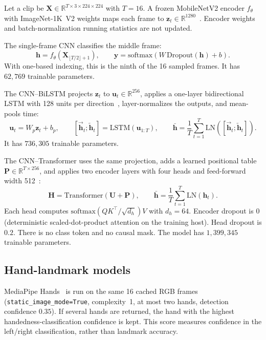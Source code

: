 \documentclass[11pt,a4paper]{article}
\begin{document}
Let a clip be $\mathbf{X} \in \mathbb{R}^{T \times 3 \times 224 \times 224}$ with $T=16$. A frozen MobileNetV2 encoder $f_{\theta}$ with ImageNet-1K~V2 weights maps each frame to $\mathbf{z}_t \in \mathbb{R}^{1280}$~\cite{sandler2018mobilenetv2}. Encoder weights and batch-normalization running statistics are not updated.

The single-frame CNN classifies the middle frame:
\begin{equation}
\mathbf{h} = f_{\theta}(\mathbf{X}_{\lfloor T/2 \rfloor+1}), \qquad
\hat{\mathbf{y}} = \mathrm{softmax}(W \,\mathrm{Dropout}(\mathbf{h}) + b).
\end{equation}
With one-based indexing, this is the ninth of the 16 sampled frames. It has $62{,}769$ trainable parameters.

The CNN--BiLSTM projects $\mathbf{z}_t$ to $\mathbf{u}_t \in \mathbb{R}^{256}$, applies a one-layer bidirectional LSTM with 128 units per direction~\cite{hochreiter1997lstm}, layer-normalizes the outputs, and mean-pools time:
\begin{equation}
\mathbf{u}_t = W_p \mathbf{z}_t + b_p, \qquad
[\overrightarrow{\mathbf{h}}_t; \overleftarrow{\mathbf{h}}_t] = \mathrm{LSTM}(\mathbf{u}_{1:T}), \qquad
\bar{\mathbf{h}} = \frac{1}{T}\sum_{t=1}^{T} \mathrm{LN}([\overrightarrow{\mathbf{h}}_t; \overleftarrow{\mathbf{h}}_t]).
\end{equation}
It has $736{,}305$ trainable parameters.

The CNN--Transformer uses the same projection, adds a learned positional table $\mathbf{P} \in \mathbb{R}^{T \times 256}$, and applies two encoder layers with four heads and feed-forward width 512~\cite{vaswani2017attention}:
\begin{equation}
\mathbf{H} = \mathrm{Transformer}(\mathbf{U} + \mathbf{P}), \qquad
\bar{\mathbf{h}} = \frac{1}{T}\sum_{t=1}^{T} \mathrm{LN}(\mathbf{h}_t).
\end{equation}
Each head computes $\mathrm{softmax}(QK^{\top}/\sqrt{d_h})V$ with $d_h = 64$. Encoder dropout is $0$ (deterministic scaled-dot-product attention on the training host). Head dropout is $0.2$. There is no class token and no causal mask. The model has $1{,}399{,}345$ trainable parameters.

\subsection{Hand-landmark models}

MediaPipe Hands~\cite{zhang2020mediapipe} is run on the same 16 cached RGB frames (\texttt{static\_image\_mode=True}, complexity~1, at most two hands, detection confidence $0.35$). If several hands are returned, the hand with the highest handedness-classification confidence is kept. This score measures confidence in the left/right classification, rather than landmark accuracy.
\end{document}
